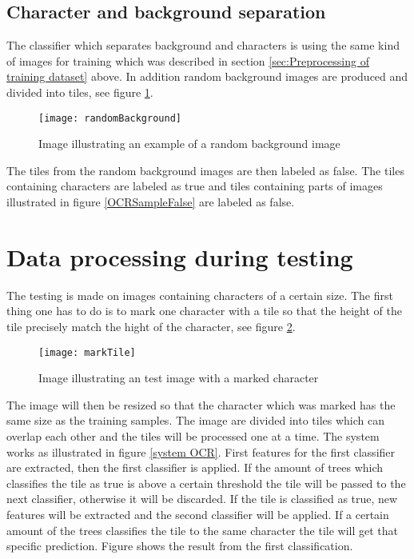 \subsection{Character and background separation}
\label{sec:Character and background separation}
The classifier which separates background and characters  is using the same kind of images for training which was described in section \ref{sec:Preprocessing of training dataset} above. In addition random background images are produced and divided into tiles, see figure \ref{randomBackground}.

\begin{figure}[H]
\centering
	\texttt{[image: randomBackground]}
	\caption{Image illustrating an example of a random background image}
	\label{randomBackground}
\end{figure}

The tiles from the random background images are then labeled as false. The tiles containing characters are labeled as true and tiles containing parts of images illustrated in figure \ref{OCRSampleFalse} are labeled as false.
  
\section{Data processing during testing}
\label{sec:Data processing during testing}
The testing is made on images containing characters of a certain size. The first thing one has to do is to mark one character with a tile so that the height of the tile precisely match the hight of the character, see figure \ref{markTile}.

\begin{figure}[H]
\centering
	\texttt{[image: markTile]}
	\caption{Image illustrating an test image with a marked character}
	\label{markTile}
\end{figure}

The image will then be resized so that the character which was marked has the same size as the training samples. The image are divided into tiles which can overlap each other and the tiles will be processed one at a time. The system works as illustrated in figure \ref{system OCR}. First features for the first classifier are extracted, then the first classifier is applied. If the amount of trees which classifies the tile as true is above a certain threshold the tile will be passed to the next classifier, otherwise it will be discarded. If the tile is classified as true, new features will be extracted and the second classifier will be applied. If a certain amount of the trees classifies the tile to the same character the tile will get that specific prediction. Figure shows the result from the first classification.

